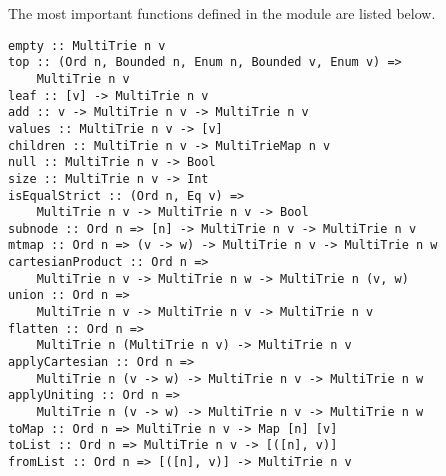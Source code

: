 \documentclass{article}
\theoremstyle{definition}
\begin{document}
The most important functions defined in the module are listed below.

\begin{lstlisting}
empty :: MultiTrie n v
top :: (Ord n, Bounded n, Enum n, Bounded v, Enum v) =>
    MultiTrie n v
leaf :: [v] -> MultiTrie n v
add :: v -> MultiTrie n v -> MultiTrie n v
values :: MultiTrie n v -> [v]
children :: MultiTrie n v -> MultiTrieMap n v
null :: MultiTrie n v -> Bool
size :: MultiTrie n v -> Int
isEqualStrict :: (Ord n, Eq v) =>
    MultiTrie n v -> MultiTrie n v -> Bool
subnode :: Ord n => [n] -> MultiTrie n v -> MultiTrie n v
mtmap :: Ord n => (v -> w) -> MultiTrie n v -> MultiTrie n w
cartesianProduct :: Ord n =>
    MultiTrie n v -> MultiTrie n w -> MultiTrie n (v, w)
union :: Ord n =>
    MultiTrie n v -> MultiTrie n v -> MultiTrie n v
flatten :: Ord n =>
    MultiTrie n (MultiTrie n v) -> MultiTrie n v
applyCartesian :: Ord n =>
    MultiTrie n (v -> w) -> MultiTrie n v -> MultiTrie n w
applyUniting :: Ord n =>
    MultiTrie n (v -> w) -> MultiTrie n v -> MultiTrie n w
toMap :: Ord n => MultiTrie n v -> Map [n] [v]
toList :: Ord n => MultiTrie n v -> [([n], v)]
fromList :: Ord n => [([n], v)] -> MultiTrie n v
\end{lstlisting}
\end{document}

